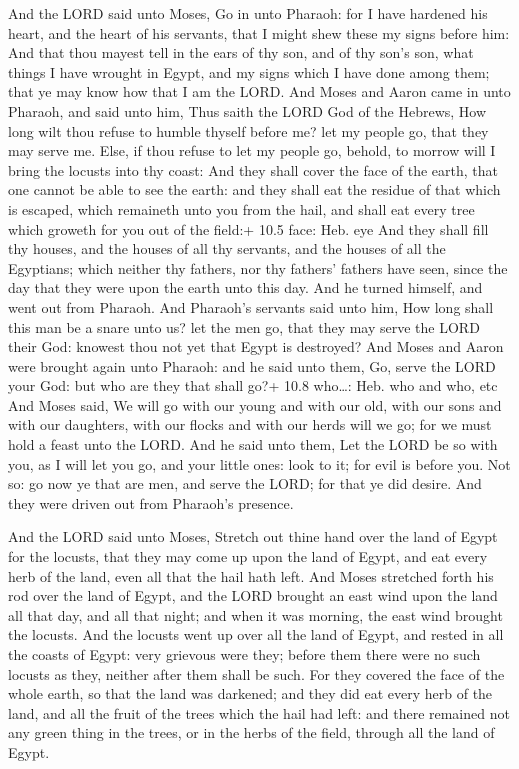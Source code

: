  And the LORD said unto Moses, Go in unto Pharaoh: for I
have hardened his heart, and the heart of his servants, that I might
shew these my signs before him:  And that thou mayest tell
in the ears of thy son, and of thy son's son, what things I have wrought
in Egypt, and my signs which I have done among them; that ye may know
how that I am the LORD.  And Moses and Aaron came in unto
Pharaoh, and said unto him, Thus saith the LORD God of the Hebrews, How
long wilt thou refuse to humble thyself before me? let my people go,
that they may serve me.  Else, if thou refuse to let my
people go, behold, to morrow will I bring the locusts into thy coast:
 And they shall cover the face of the earth, that one cannot
be able to see the earth: and they shall eat the residue of that which
is escaped, which remaineth unto you from the hail, and shall eat every
tree which groweth for you out of the field:+ 10.5 face: Heb. eye
 And they shall fill thy houses, and the houses of all thy
servants, and the houses of all the Egyptians; which neither thy
fathers, nor thy fathers' fathers have seen, since the day that they
were upon the earth unto this day. And he turned himself, and went out
from Pharaoh.  And Pharaoh's servants said unto him, How
long shall this man be a snare unto us? let the men go, that they may
serve the LORD their God: knowest thou not yet that Egypt is destroyed?
 And Moses and Aaron were brought again unto Pharaoh: and he
said unto them, Go, serve the LORD your God: but who are they that shall
go?+ 10.8 who\ldots: Heb. who and who, etc  And Moses said,
We will go with our young and with our old, with our sons and with our
daughters, with our flocks and with our herds will we go; for we must
hold a feast unto the LORD.  And he said unto them, Let the
LORD be so with you, as I will let you go, and your little ones: look to
it; for evil is before you.  Not so: go now ye that are
men, and serve the LORD; for that ye did desire. And they were driven
out from Pharaoh's presence.

 And the LORD said unto Moses, Stretch out thine hand
over the land of Egypt for the locusts, that they may come up upon the
land of Egypt, and eat every herb of the land, even all that the hail
hath left.  And Moses stretched forth his rod over the land
of Egypt, and the LORD brought an east wind upon the land all that day,
and all that night; and when it was morning, the east wind brought the
locusts.  And the locusts went up over all the land of
Egypt, and rested in all the coasts of Egypt: very grievous were they;
before them there were no such locusts as they, neither after them shall
be such.  For they covered the face of the whole earth, so
that the land was darkened; and they did eat every herb of the land, and
all the fruit of the trees which the hail had left: and there remained
not any green thing in the trees, or in the herbs of the field, through
all the land of Egypt.

